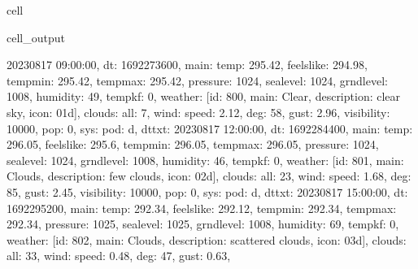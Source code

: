 \documentclass[letterpaper,10pt,english]{jupyterBook}
\begin{document}
\begin{sphinxuseclass}{cell}
\begin{sphinxVerbatimOutput}
\begin{sphinxuseclass}{cell_output}
\begin{sphinxVerbatim}[commandchars=\\\{\}]
\PYGZsq{}2023\PYGZhy{}08\PYGZhy{}17 09:00:00\PYGZsq{}\PYGZcb{}, \PYGZob{}\PYGZsq{}dt\PYGZsq{}: 1692273600, \PYGZsq{}main\PYGZsq{}: \PYGZob{}\PYGZsq{}temp\PYGZsq{}: 295.42, \PYGZsq{}feels\PYGZus{}like\PYGZsq{}: 294.98, \PYGZsq{}temp\PYGZus{}min\PYGZsq{}: 295.42, \PYGZsq{}temp\PYGZus{}max\PYGZsq{}: 295.42, \PYGZsq{}pressure\PYGZsq{}: 1024, \PYGZsq{}sea\PYGZus{}level\PYGZsq{}: 1024, \PYGZsq{}grnd\PYGZus{}level\PYGZsq{}: 1008, \PYGZsq{}humidity\PYGZsq{}: 49, \PYGZsq{}temp\PYGZus{}kf\PYGZsq{}: 0\PYGZcb{}, \PYGZsq{}weather\PYGZsq{}: [\PYGZob{}\PYGZsq{}id\PYGZsq{}: 800, \PYGZsq{}main\PYGZsq{}: \PYGZsq{}Clear\PYGZsq{}, \PYGZsq{}description\PYGZsq{}: \PYGZsq{}clear sky\PYGZsq{}, \PYGZsq{}icon\PYGZsq{}: \PYGZsq{}01d\PYGZsq{}\PYGZcb{}], \PYGZsq{}clouds\PYGZsq{}: \PYGZob{}\PYGZsq{}all\PYGZsq{}: 7\PYGZcb{}, \PYGZsq{}wind\PYGZsq{}: \PYGZob{}\PYGZsq{}speed\PYGZsq{}: 2.12, \PYGZsq{}deg\PYGZsq{}: 58, \PYGZsq{}gust\PYGZsq{}: 2.96\PYGZcb{}, \PYGZsq{}visibility\PYGZsq{}: 10000, \PYGZsq{}pop\PYGZsq{}: 0, \PYGZsq{}sys\PYGZsq{}: \PYGZob{}\PYGZsq{}pod\PYGZsq{}: \PYGZsq{}d\PYGZsq{}\PYGZcb{}, \PYGZsq{}dt\PYGZus{}txt\PYGZsq{}: \PYGZsq{}2023\PYGZhy{}08\PYGZhy{}17 12:00:00\PYGZsq{}\PYGZcb{}, \PYGZob{}\PYGZsq{}dt\PYGZsq{}: 1692284400, \PYGZsq{}main\PYGZsq{}: \PYGZob{}\PYGZsq{}temp\PYGZsq{}: 296.05, \PYGZsq{}feels\PYGZus{}like\PYGZsq{}: 295.6, \PYGZsq{}temp\PYGZus{}min\PYGZsq{}: 296.05, \PYGZsq{}temp\PYGZus{}max\PYGZsq{}: 296.05, \PYGZsq{}pressure\PYGZsq{}: 1024, \PYGZsq{}sea\PYGZus{}level\PYGZsq{}: 1024, \PYGZsq{}grnd\PYGZus{}level\PYGZsq{}: 1008, \PYGZsq{}humidity\PYGZsq{}: 46, \PYGZsq{}temp\PYGZus{}kf\PYGZsq{}: 0\PYGZcb{}, \PYGZsq{}weather\PYGZsq{}: [\PYGZob{}\PYGZsq{}id\PYGZsq{}: 801, \PYGZsq{}main\PYGZsq{}: \PYGZsq{}Clouds\PYGZsq{}, \PYGZsq{}description\PYGZsq{}: \PYGZsq{}few clouds\PYGZsq{}, \PYGZsq{}icon\PYGZsq{}: \PYGZsq{}02d\PYGZsq{}\PYGZcb{}], \PYGZsq{}clouds\PYGZsq{}: \PYGZob{}\PYGZsq{}all\PYGZsq{}: 23\PYGZcb{}, \PYGZsq{}wind\PYGZsq{}: \PYGZob{}\PYGZsq{}speed\PYGZsq{}: 1.68, \PYGZsq{}deg\PYGZsq{}: 85, \PYGZsq{}gust\PYGZsq{}: 2.45\PYGZcb{}, \PYGZsq{}visibility\PYGZsq{}: 10000, \PYGZsq{}pop\PYGZsq{}: 0, \PYGZsq{}sys\PYGZsq{}: \PYGZob{}\PYGZsq{}pod\PYGZsq{}: \PYGZsq{}d\PYGZsq{}\PYGZcb{}, \PYGZsq{}dt\PYGZus{}txt\PYGZsq{}: \PYGZsq{}2023\PYGZhy{}08\PYGZhy{}17 15:00:00\PYGZsq{}\PYGZcb{}, \PYGZob{}\PYGZsq{}dt\PYGZsq{}: 1692295200, \PYGZsq{}main\PYGZsq{}: \PYGZob{}\PYGZsq{}temp\PYGZsq{}: 292.34, \PYGZsq{}feels\PYGZus{}like\PYGZsq{}: 292.12, \PYGZsq{}temp\PYGZus{}min\PYGZsq{}: 292.34, \PYGZsq{}temp\PYGZus{}max\PYGZsq{}: 292.34, \PYGZsq{}pressure\PYGZsq{}: 1025, \PYGZsq{}sea\PYGZus{}level\PYGZsq{}: 1025, \PYGZsq{}grnd\PYGZus{}level\PYGZsq{}: 1008, \PYGZsq{}humidity\PYGZsq{}: 69, \PYGZsq{}temp\PYGZus{}kf\PYGZsq{}: 0\PYGZcb{}, \PYGZsq{}weather\PYGZsq{}: [\PYGZob{}\PYGZsq{}id\PYGZsq{}: 802, \PYGZsq{}main\PYGZsq{}: \PYGZsq{}Clouds\PYGZsq{}, \PYGZsq{}description\PYGZsq{}: \PYGZsq{}scattered clouds\PYGZsq{}, \PYGZsq{}icon\PYGZsq{}: \PYGZsq{}03d\PYGZsq{}\PYGZcb{}], \PYGZsq{}clouds\PYGZsq{}: \PYGZob{}\PYGZsq{}all\PYGZsq{}: 33\PYGZcb{}, \PYGZsq{}wind\PYGZsq{}: \PYGZob{}\PYGZsq{}speed\PYGZsq{}: 0.48, \PYGZsq{}deg\PYGZsq{}: 47, \PYGZsq{}gust\PYGZsq{}: 0.63\PYGZcb{}, 
\end{sphinxVerbatim}
\end{sphinxuseclass}
\end{sphinxVerbatimOutput}
\end{sphinxuseclass}
\end{document}

